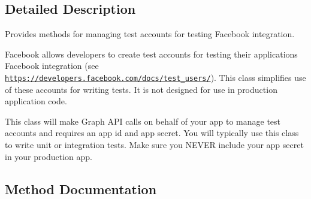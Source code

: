 \subsection{Detailed Description}
Provides methods for managing test accounts for testing Facebook integration.

Facebook allows developers to create test accounts for testing their applications\textquotesingle{} Facebook integration (see \href{https://developers.facebook.com/docs/test_users/}{\tt https\+://developers.\+facebook.\+com/docs/test\+\_\+users/}). This class simplifies use of these accounts for writing tests. It is not designed for use in production application code.

This class will make Graph A\+P\+I calls on behalf of your app to manage test accounts and requires an app id and app secret. You will typically use this class to write unit or integration tests. Make sure you N\+E\+V\+E\+R include your app secret in your production app. 

\subsection{Method Documentation}
\hypertarget{interface_f_b_s_d_k_test_users_manager_a2b6f759bb6df5a0e48be766249bd39b9}{}
